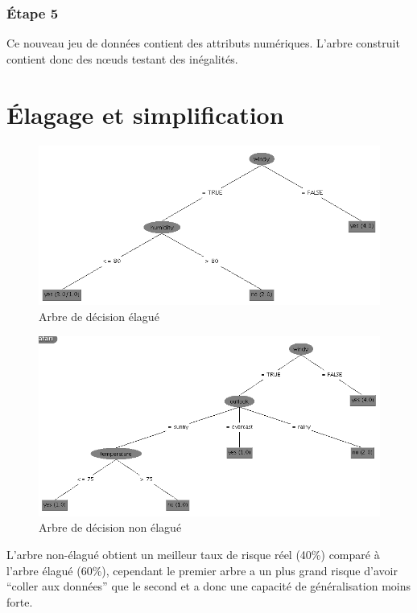 \documentclass[a4paper,12pt]{article}
\begin{document}
\subsubsection*{\'Etape 5}
Ce nouveau jeu de données contient des attributs numériques.
L’arbre construit contient donc des nœuds testant des inégalités.

\section{\'Elagage et simplification}

\begin{figure}
	\center
	\includegraphics[width=1\textwidth]{arbre-elague.png}
	\caption{Arbre de décision élagué}
	\label{fig:arbre-elague}
\end{figure}
\begin{figure}
	\center
	\includegraphics[width=1\textwidth]{arbre-non-elague.png}
	\caption{Arbre de décision non élagué}
	\label{fig:arbre-non-elague}
\end{figure}
L’arbre non-élagué obtient un meilleur taux de risque réel (40\%) comparé à l’arbre élagué (60\%), cependant le premier arbre a un plus grand risque d'avoir \enquote{coller aux données} que le second et a donc une capacité de généralisation moins forte.
\end{document}
